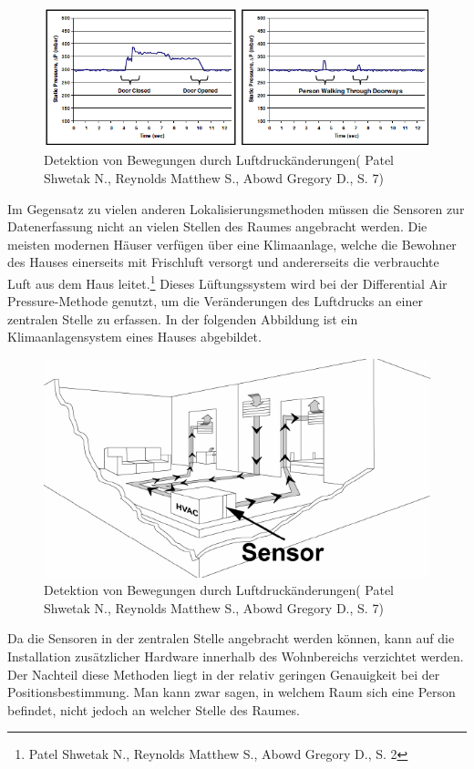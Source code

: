 \begin{figure}[H]
	\centering
	\includegraphics[width=1.0\textwidth]{pictures/dap_diagramm}
	\caption{Detektion von Bewegungen durch Luftdruckänderungen( Patel Shwetak N., Reynolds Matthew S., Abowd Gregory D., S. 7)}
\end{figure} 

Im Gegensatz zu vielen anderen Lokalisierungsmethoden müssen die Sensoren zur Datenerfassung nicht an vielen Stellen des Raumes angebracht werden. Die meisten modernen Häuser verfügen über eine Klimaanlage, welche die Bewohner des Hauses einerseits mit Frischluft versorgt und andererseits die verbrauchte Luft aus dem Haus leitet.\footnote{Patel Shwetak N., Reynolds Matthew S., Abowd Gregory D., S. 2} Dieses Lüftungssystem wird bei der Differential Air Pressure-Methode genutzt, um die Veränderungen des Luftdrucks an einer zentralen Stelle zu erfassen. In der folgenden Abbildung ist ein Klimaanlagensystem eines Hauses abgebildet. 

\begin{figure}[H]
	\centering
	\includegraphics[width=1.0\textwidth]{pictures/dap_klima}
	\caption{Detektion von Bewegungen durch Luftdruckänderungen( Patel Shwetak N., Reynolds Matthew S., Abowd Gregory D., S. 7)}
\end{figure} 

Da die Sensoren in der zentralen Stelle angebracht werden können, kann auf die Installation zusätzlicher Hardware innerhalb des Wohnbereichs verzichtet werden. Der Nachteil diese Methoden liegt in der relativ geringen Genauigkeit bei der Positionsbestimmung. Man kann zwar sagen, in welchem Raum sich eine Person befindet, nicht jedoch an welcher Stelle des Raumes.

